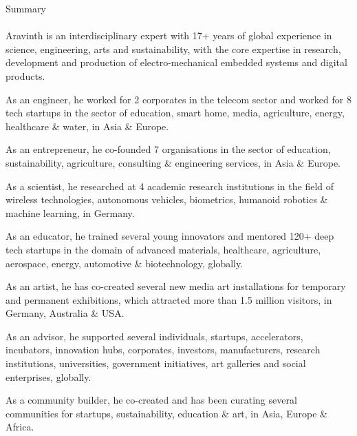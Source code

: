 \clearpage
\pagebreak
{
	\centering
	\Huge Summary
	\par
}

\paragraph{}
\Large
Aravinth is an interdisciplinary expert with 17+ years of global experience in science, engineering, arts and sustainability, with the core expertise in research, development and production of electro-mechanical embedded systems and digital products.

As an engineer, he worked for 2 corporates in the telecom sector and worked for 8 tech startups in the sector of education, smart home, media, agriculture, energy, healthcare \& water, in Asia \& Europe.

As an entrepreneur, he co-founded 7 organisations in the sector of education, sustainability, agriculture, consulting \& engineering services, in Asia \& Europe.

As a scientist, he researched at 4 academic research institutions in the field of wireless technologies, autonomous vehicles, biometrics, humanoid robotics \& machine learning, in Germany.

As an educator, he trained several young innovators and mentored 120+ deep tech startups in the domain of advanced materials, healthcare, agriculture, aerospace, energy, automotive \& biotechnology, globally.

As an artist, he has co-created several new media art installations for temporary and permanent exhibitions, which attracted more than 1.5 million visitors, in Germany, Australia \& USA.

As an advisor, he supported several individuals, startups, accelerators, incubators, innovation hubs, corporates, investors, manufacturers, research institutions, universities, government initiatives, art galleries and social enterprises, globally.

As a community builder, he co-created and has been curating several communities for startups, sustainability, education \& art, in Asia, Europe \& Africa.

\clearpage
